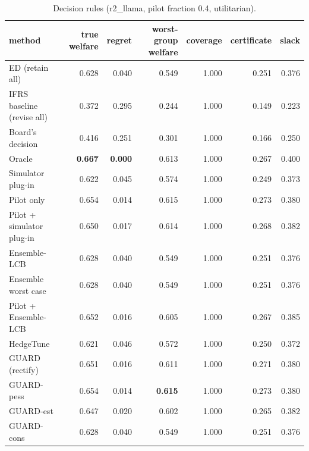\begin{table}[t]
\centering
\small
\begin{tabular}{lrrrrrr}
\toprule
method & true welfare & regret & worst-group welfare & coverage & certificate & slack \\
\midrule
ED (retain all) & 0.628 & 0.040 & 0.549 & 1.000 & 0.251 & 0.376 \\
IFRS baseline (revise all) & 0.372 & 0.295 & 0.244 & 1.000 & 0.149 & 0.223 \\
Board's decision & 0.416 & 0.251 & 0.301 & 1.000 & 0.166 & 0.250 \\
Oracle & \textbf{0.667} & \textbf{0.000} & 0.613 & 1.000 & 0.267 & 0.400 \\
Simulator plug-in & 0.622 & 0.045 & 0.574 & 1.000 & 0.249 & 0.373 \\
Pilot only & 0.654 & 0.014 & 0.615 & 1.000 & 0.273 & 0.380 \\
Pilot + simulator plug-in & 0.650 & 0.017 & 0.614 & 1.000 & 0.268 & 0.382 \\
Ensemble-LCB & 0.628 & 0.040 & 0.549 & 1.000 & 0.251 & 0.376 \\
Ensemble worst case & 0.628 & 0.040 & 0.549 & 1.000 & 0.251 & 0.376 \\
Pilot + Ensemble-LCB & 0.652 & 0.016 & 0.605 & 1.000 & 0.267 & 0.385 \\
HedgeTune & 0.621 & 0.046 & 0.572 & 1.000 & 0.250 & 0.372 \\
GUARD (rectify) & 0.651 & 0.016 & 0.611 & 1.000 & 0.271 & 0.380 \\
GUARD-pess & 0.654 & 0.014 & \textbf{0.615} & 1.000 & 0.273 & 0.380 \\
GUARD-est & 0.647 & 0.020 & 0.602 & 1.000 & 0.265 & 0.382 \\
GUARD-cons & 0.628 & 0.040 & 0.549 & 1.000 & 0.251 & 0.376 \\
\bottomrule
\end{tabular}
\caption{Decision rules (r2\_llama, pilot fraction 0.4, utilitarian).}
\label{tab:methods-utilitarian}
\end{table}
